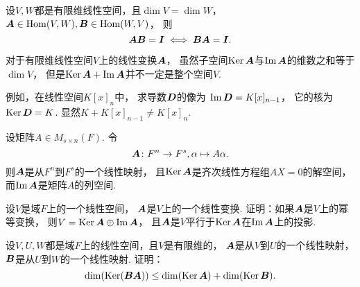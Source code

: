 \begin{proposition}
设\(V,W\)都是有限维线性空间，且\(\dim V = \dim W\)，
\(\boldsymbol{A}\in\operatorname{Hom}(V,W),
\boldsymbol{B}\in\operatorname{Hom}(W,V)\)，
则\begin{equation*}
	\boldsymbol{A}\boldsymbol{B} = \boldsymbol{I}
	\iff
	\boldsymbol{B}\boldsymbol{A} = \boldsymbol{I}.
\end{equation*}
\end{proposition}

\begin{remark}
对于有限维线性空间\(V\)上的线性变换\(\boldsymbol{A}\)，
虽然子空间\(\operatorname{Ker}\boldsymbol{A}\)与\(\operatorname{Im}\boldsymbol{A}\)的维数之和等于\(\dim V\)，
但是\(\operatorname{Ker}\boldsymbol{A}+\operatorname{Im}\boldsymbol{A}\)并不一定是整个空间\(V\).

例如，在线性空间\(K[x]_n\)中，
求导数\(\boldsymbol{D}\)的像为
\(\operatorname{Im}\boldsymbol{D}=K[x]_{n-1}\)，
它的核为\(\operatorname{Ker}\boldsymbol{D}=K\).
显然\(K+K[x]_{n-1}\neq K[x]_n\).
\end{remark}

\begin{example}
设矩阵\(A \in M_{s \times n}(F)\).
令\begin{equation*}
	\boldsymbol{A}\colon F^n \to F^s, \alpha \mapsto A\alpha.
\end{equation*}
则\(\boldsymbol{A}\)是从\(F^n\)到\(F^s\)的一个线性映射，
且\(\operatorname{Ker}\boldsymbol{A}\)是齐次线性方程组\(AX=0\)的解空间，
而\(\operatorname{Im}\boldsymbol{A}\)是矩阵\(A\)的列空间.
\end{example}

\begin{example}
设\(V\)是域\(F\)上的一个线性空间，
\(\boldsymbol{A}\)是\(V\)上的一个线性变换.
证明：如果\(\boldsymbol{A}\)是\(V\)上的幂等变换，
则\(V = \operatorname{Ker}\boldsymbol{A} \oplus \operatorname{Im}\boldsymbol{A}\)，
且\(\boldsymbol{A}\)是\(V\)平行于\(\operatorname{Ker}\boldsymbol{A}\)在\(\operatorname{Im}\boldsymbol{A}\)上的投影.
\end{example}

\begin{example}
设\(V,U,W\)都是域\(F\)上的线性空间，且\(V\)是有限维的，
\(\boldsymbol{A}\)是从\(V\)到\(U\)的一个线性映射，
\(\boldsymbol{B}\)是从\(U\)到\(W\)的一个线性映射.
证明：\begin{equation*}
	\dim(\operatorname{Ker}(\boldsymbol{B}\boldsymbol{A}))
	\leq
	\dim(\operatorname{Ker}\boldsymbol{A})
	+ \dim(\operatorname{Ker}\boldsymbol{B}).
\end{equation*}
\end{example}

